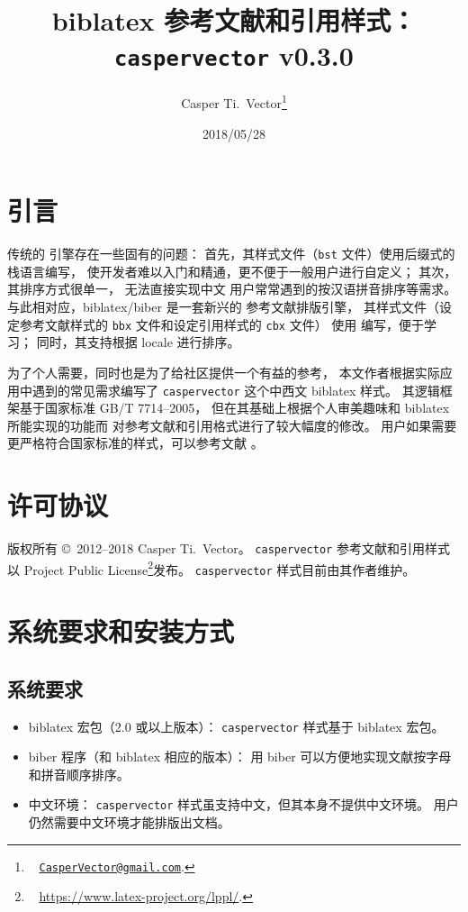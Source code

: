 \documentclass[UTF8]{ctexart}
\begin{document}
\title{\textbf{biblatex 参考文献和引用样式：\texttt{caspervector} v0.3.0}}
\author{%
	Casper Ti.\ Vector\thanks{\ %
		\href{mailto:CasperVector@gmail.com}{\texttt{CasperVector@gmail.com}}.%
	}%
}
\date{2018/05/28}
\maketitle

\section{引言}

传统的  引擎存在一些固有的问题：
首先，其样式文件（\verb|bst| 文件）使用后缀式的栈语言编写，
使开发者难以入门和精通，更不便于一般用户进行自定义；
其次，其排序方式很单一，
无法直接实现中文  用户常常遇到的按汉语拼音排序等需求。
与此相对应，biblatex\supercite{biblatex}/biber\supercite{biber}
是一套新兴的  参考文献排版引擎，
其样式文件（设定参考文献样式的 \verb|bbx| 文件和设定引用样式的 \verb|cbx| 文件）
使用  编写，便于学习；
同时，其支持根据 locale 进行排序。

为了个人需要，同时也是为了给社区提供一个有益的参考，
本文作者根据实际应用中遇到的常见需求编写了
\verb|caspervector| 这个中西文 biblatex 样式。
其逻辑框架基于国家标准 GB/T 7714--2005\supercite{gbt7714-2005}，
但在其基础上根据个人审美趣味和 biblatex 所能实现的功能而
对参考文献和引用格式进行了较大幅度的修改。
用户如果需要更严格符合国家标准的样式，可以参考文献 \parencite{blx-gb7714-2015}。

\section{许可协议}

版权所有 \copyright\ 2012--2018 Casper Ti.\ Vector。%
\verb|caspervector| 参考文献和引用样式以
 Project Public License\footnote{\ %
	\url{https://www.latex-project.org/lppl/}.%
}发布。%
\verb|caspervector| 样式目前由其作者维护。

\section{系统要求和安装方式}
\subsection{系统要求}

\begin{itemize}
	\item biblatex 宏包（2.0 或以上版本）：%
		\verb|caspervector| 样式基于 biblatex 宏包。
	\item biber 程序（和 biblatex 相应的版本）：
		用 biber 可以方便地实现文献按字母和拼音顺序排序。
	\item 中文环境：%
		\verb|caspervector| 样式虽支持中文，但其本身不提供中文环境。
		用户仍然需要中文环境才能排版出文档。
\end{itemize}
\end{document}
